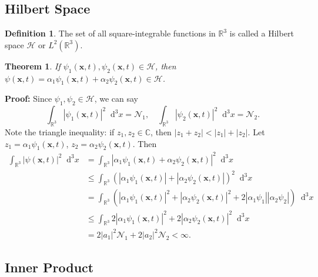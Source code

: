 \documentclass[12pt]{article}
\newcommand{\Diff}[1]{\mathop{}\!\mathrm{d}^{#1}}
\newtheorem{theorem}{Theorem}[section]
\theoremstyle{definition}
\newtheorem{definition}{Definition}[section]
\theoremstyle{remark}
\begin{document}
\subsection{Hilbert Space}%
\label{sub:hilbert_space}

\begin{definition}
	The set of all square-integrable functions in $\mathbb{R}^3$ is called a Hilbert space $\mathcal{H}$ or $L^2(\mathbb{R}^3)$.
\end{definition}

\begin{theorem}
	If $\psi_1(\mathbf{x}, t), \psi_2(\mathbf{x}, t) \in \mathcal{H}$, then $\psi(\mathbf{x}, t) = \alpha_1 \psi_1(\mathbf{x}, t) + \alpha_2 \psi_2(\mathbf{x}, t) \in \mathcal{H}$.
\end{theorem}

\begin{adjustbox}{minipage = \columnwidth - 25.5pt, margin=1em, frame=1pt, margin=0em}
\textbf{Proof:} Since $\psi_1, \psi_2 \in \mathcal{H}$, we can say
\[
	\int_{\mathbb{R}^3} |\psi_1(\mathbf{x}, t)|^2\Diff3 x = \mathcal{N}_1, \quad \int_{\mathbb{R}^3} |\psi_2 (\mathbf{x}, t)|^2\Diff3 x = \mathcal{N}_2
.\]
Note the triangle inequality: if $z_1, z_2 \in \mathbb{C}$, then $|z_1 + z_2| < |z_1| + |z_2|$. Let $z_1 = \alpha_1 \psi_1(\mathbf{x}, t)$, $z_2 = \alpha_2 \psi_2 (\mathbf{x}, t)$. Then
\begin{align*}
	\int_{\mathbb{R}^3}|\psi(\mathbf{x}, t)|^2\Diff3 x &= \int_{\mathbb{R}^3} |\alpha_1 \psi_1(\mathbf{x}, t) + \alpha_2 \psi_2(\mathbf{x}, t)|^2\Diff3 x \\
							   &\leq \int_{\mathbb{R}^3} (|\alpha_1 \psi_1(\mathbf{x}, t)| + |\alpha_2 \psi_2(\mathbf{x}, t)|)^2\Diff3 x \\
							   &= \int_{\mathbb{R}^3}(|\alpha_1 \psi_1(\mathbf{x}, t)|^2 + |\alpha_2 \psi_2(\mathbf{x}, t)|^2 + 2|\alpha_1 \psi_1||\alpha_2\psi_2|)\Diff3 x \\
							   &\leq \int_{\mathbb{R}^3} 2|\alpha_1 \psi_1(\mathbf{x}, t)|^2 + 2|\alpha_2 \psi_2(\mathbf{x}, t)|^2\Diff3 x \\
							   &= 2|a_1|^2\mathcal{N}_1 + 2|a_2|^2\mathcal{N}_2 < \infty.
\end{align*}
\end{adjustbox}

\subsection{Inner Product}%
\label{sub:inner_product}
\end{document}
